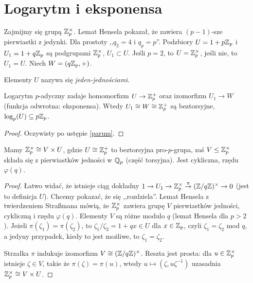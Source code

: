 \section{Logarytm i eksponensa \label{sekcjalog}}
Zajmijmy się grupą $\mathbb Z_p^\times$.
Lemat Hensela pokazał, że zawiera $(p-1)$-sze pierwiastki z jedynki.
Dla prostoty ,,$q_2 = 4$ i $q_p = p$''.
Podzbiory $U = 1 + p\mathbb Z_p$ i $U_1 = 1 + q\mathbb Z_p$ są podgrupami $\mathbb Z_p^\times$, $U_1 \subset U$. Jeśli $p = 2$, to $U = \mathbb Z_p^\times$, jeśli nie, to $U_1 = U$.
Niech $W = (q\mathbb Z_p, +)$.

\begin{definicja}
	Elementy $U$ nazywa się \emph{jeden-jednościami}.
\end{definicja}

\begin{fakt}
	Logarytm $p$-adyczny zadaje homomorfizm $U \to \mathbb Z_p^+$ oraz izomorfizm $U_1 \to W$ (funkcja odwrotna: eksponensa).
	Wtedy $U_1 \cong W \cong \mathbb Z_p^+$ są beztorsyjne, $\log_p(U) \subseteq p\mathbb Z_p$.
\end{fakt}

\begin{proof}
	Oczywisty po ustępie \ref{parum}.
\end{proof}

\begin{wniosek}\label{hostis}
	Mamy $\mathbb Z_p^\times \cong V \times U$, gdzie $U \cong \mathbb Z_p^+$ to beztorsyjna pro-$p$-grupa, zaś $V \le \mathbb Z_p^\times$ składa się z pierwiastków jedności w $\mathbb Q_p$ (część torsyjna).
	Jest cykliczna, rzędu $\varphi(q)$.
\end{wniosek}

\begin{proof}
	Łatwo widać, że istnieje ciąg dokładny $1 \to U_1 \to \mathbb Z_p^\times \stackrel \pi \to  (\mathbb Z/q\mathbb Z)^\times \to 0$ (jest to definicja $U$).
	Chcemy pokazać, że się ,,rozdziela''.
	Lemat Hensela z twierdzeniem Straßmana mówią, że $\mathbb Z_p^\times$ zawiera grupę $V$ pierwiastków jedności, cykliczną i rzędu $\varphi(q)$.
	Elementy $V$ są różne modulo $q$ (lemat Hensela dla $p > 2$).
	Jeżeli $\pi(\zeta_1) = \pi(\zeta_2)$, to $\zeta_1 / \zeta_2 = 1 + qx \in U$ dla $x \in \mathbb Z_p$, czyli $\zeta_1 = \zeta_2$ mod $q$, a jedyny przypadek, kiedy to jest możliwe, to $\zeta_1 = \zeta_2$.

	Strzałka $\pi$ indukuje izomorfizm $V \cong (\mathbb Z/q\mathbb Z)^\times$.
	Reszta jest prosta: dla $u \in \mathbb Z_p^\times$ istnieje $\zeta \in V$, takie że $\pi(\zeta) = \pi(u)$, wtedy $u \mapsto (\zeta, u \zeta^{-1})$ uzasadnia $\mathbb Z_p^\times \cong V \times U$.
\end{proof}


